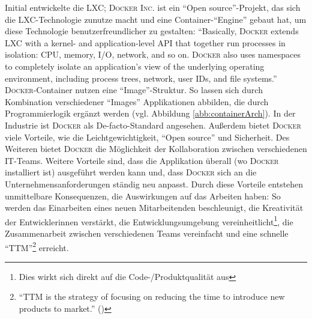 Initial entwickelte \cite{canonical_ltd_linux_2020} die \ac{LXC}; \textsc{Docker Inc.} ist ein \enquote{Open source}-Projekt, das sich die \ac{LXC}-Technologie zunutze macht und eine Container-\enquote{Engine} gebaut hat, um diese Technologie benutzerfreundlicher zu gestalten: \enquote{Basically, \textsc{Docker} extends LXC with a kernel- and application-level API that together run processes in isolation: CPU, memory, I/O, network, and so on. \textsc{Docker} also uses namespaces to completely isolate an application’s view of the underlying operating environment, including process trees, network, user IDs, and file systems.}\autocite[][S.\,82]{bernstein_containers_2014} \textsc{Docker}-Container nutzen eine \enquote{Image}-Struktur. So lassen sich durch Kombination verschiedener \enquote{Images} Applikationen abbilden, die durch Programmierlogik ergänzt werden (vgl. Abbildung \vref{abb:containerArch}). In der Industrie ist \textsc{Docker} als De-facto-Standard\autocite[vgl.][S.\,30]{pahl_containerization_2015} angesehen\autocite[vgl.][S.\,1]{kharb_automated_2016}. Außerdem bietet \textsc{Docker} viele Vorteile, wie die Leichtgewichtigkeit, \enquote{Open source} und Sicherheit. Des Weiteren bietet \textsc{Docker} die Möglichkeit der Kollaboration zwischen verschiedenen IT-Teams. Weitere Vorteile sind, dass die Applikation überall (wo \textsc{Docker} installiert ist) ausgeführt werden kann und, dass \textsc{Docker} sich an die Unternehmensanforderungen ständig neu anpasst.\autocite[vgl.][S.\,1]{kharb_automated_2016} Durch diese Vorteile entstehen unmittelbare Konsequenzen, die Auswirkungen auf das Arbeiten haben: So werden das Einarbeiten eines neuen Mitarbeitenden beschleunigt, die Kreativität der Entwicklerinnen verstärkt, die Entwicklungsumgebung vereinheitlicht\footnote{Dies wirkt sich direkt auf die Code-/Produktqualität aus}, die Zusammenarbeit zwischen verschiedenen Teams vereinfacht und eine schnelle \enquote{\ac{TTM}}\footnote{\enquote{TTM is the strategy of focusing on reducing the time to introduce new products to market.} (\cite[][S.\,14]{pawar_time_1994})} erreicht.\autocite[vgl.][S.\,2]{kharb_automated_2016} 
\par 
